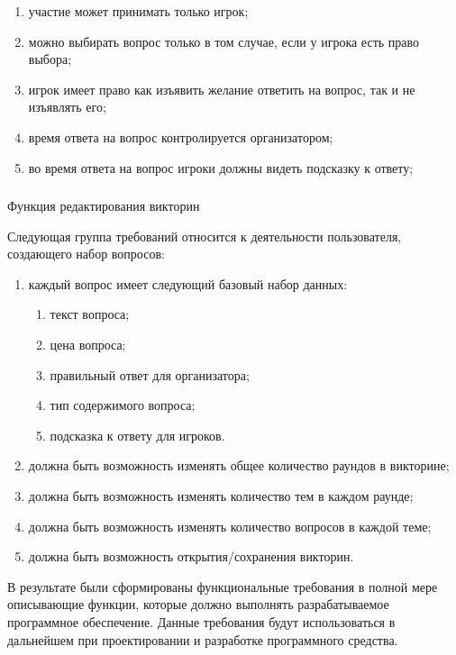 \begin{enumerate}
	\item участие может принимать только игрок;
	\item можно выбирать вопрос только в том случае, если у игрока есть право выбора;
	\item игрок имеет право как изъявить желание ответить на вопрос, так и не изъявлять его;
	\item время ответа на вопрос контролируется организатором;
	\item во время ответа на вопрос игроки должны видеть подсказку к ответу;
\end{enumerate}

\subsubsection{} Функция редактирования викторин
\label{sec:domain:specification:edit}

Следующая группа требований относится к деятельности пользователя, создающего набор вопросов:

\begin{enumerate}
	\item каждый вопрос имеет следующий базовый набор данных:
	\begin{enumerate}
		\item текст вопроса;
		\item цена вопроса;
		\item правильный ответ для организатора;
		\item тип содержимого вопроса;
		\item подсказка к ответу для игроков.
	\end{enumerate}
	\item должна быть возможность изменять общее количество раундов в викторине; 
	\item должна быть возможность изменять количество тем в каждом раунде;
	\item должна быть возможность изменять количество вопросов в каждой теме;
	\item должна быть возможность открытия/сохранения викторин.
\end{enumerate}

В результате были сформированы функциональные требования в полной мере описывающие функции, которые должно выполнять разрабатываемое программное обеспечение. Данные
требования будут использоваться в дальнейшем при проектировании и разработке программного средства.